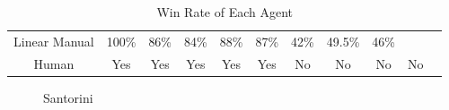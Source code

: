 \documentclass[a4paper,12pt,table]{article}
\begin{document}
\begin{table}[H]
{\begin{tabular}{|c|cccccccccc}
    Linear Manual & \multicolumn{1}{c|}{100\%}                       & \multicolumn{1}{c|}{86\%}                        & \multicolumn{1}{c|}{84\%}                      & \multicolumn{1}{c|}{88\%}                       & \multicolumn{1}{c|}{87\%}                       & \multicolumn{1}{c|}{42\%}                           & \multicolumn{1}{c|}{49.5\%}                     & \multicolumn{1}{c|}{46\%}                        & \cellcolor[HTML]{000000}                        & \cellcolor[HTML]{000000}                        \\ \cline{1-10}
    Human          & \multicolumn{1}{c|}{Yes}                      & \multicolumn{1}{c|}{Yes}                      & \multicolumn{1}{c|}{Yes}                           & \multicolumn{1}{c|}{Yes}                      & \multicolumn{1}{c|}{Yes}                           & \multicolumn{1}{c|}{No}                           & \multicolumn{1}{c|}{No}                           & \multicolumn{1}{c|}{No}                           & \multicolumn{1}{c|}{No}                           & \cellcolor[HTML]{000000}                        \\ \cline{1-10}
    \end{tabular}
    }
    \caption{Win Rate of Each Agent}
    \label{table:}
\end{table}

\begin{figure}[H]
    \centering
    \qquad
    \caption{Santorini}
    \label{fig:}
\end{figure}
\end{document}
